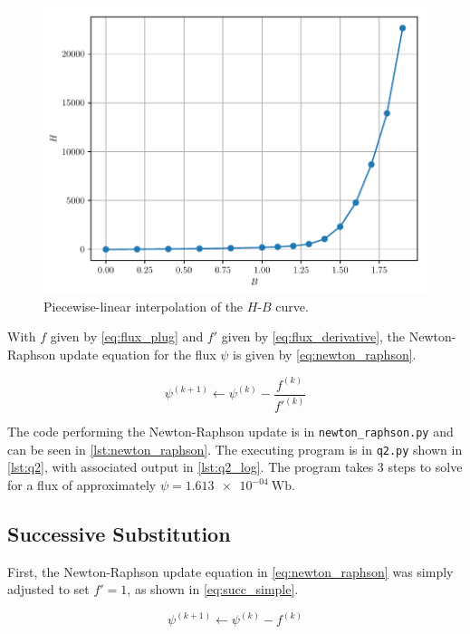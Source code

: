 \documentclass[a4paper,titlepage]{article}
\newcommand{\code}[1]{\texttt{#1}}
\begin{document}
	\begin{figure}[!htb]
		\centering
		\includegraphics[width=\columnwidth]{plots/q2b.pdf}
		\caption
		{Piecewise-linear interpolation of the $H$-$B$ curve.}
		\label{fig:q2b}
	\end{figure}
	
	With $f$ given by \cref{eq:flux_plug} and $f'$ given by \cref{eq:flux_derivative}, the Newton-Raphson update equation for the flux $\psi$ is given by \cref{eq:newton_raphson}.
	
	\begin{equation} \label{eq:newton_raphson}
		\psi^{(k+1)} \leftarrow \psi^{(k)} - \frac{f^{(k)}}{{f'}^{(k)}}
	\end{equation}
	
	The code performing the Newton-Raphson update is in \code{newton\_raphson.py} and can be seen in \cref{lst:newton_raphson}. The executing program is in \code{q2.py} shown in \cref{lst:q2}, with associated output in \cref{lst:q2_log}. The program takes 3 steps to solve for a flux of approximately $\psi = \SI{1.613e-04}{\weber}$.
	
	\subsection{Successive Substitution}
	
	First, the Newton-Raphson update equation in \cref{eq:newton_raphson} was simply adjusted to set $f'=1$, as shown in \cref{eq:succ_simple}.
	
	\begin{equation} \label{eq:succ_simple}
		\psi^{(k+1)} \leftarrow \psi^{(k)} - f^{(k)}
	\end{equation}
	
\end{document}
